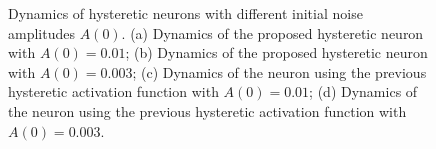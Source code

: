 \documentclass[10pt, a4paper, twocolumn]{article}
\begin{document}
\begin{figure}
\caption{ Dynamics of hysteretic neurons with different initial
noise amplitudes $A(0)$. (a) Dynamics of the proposed hysteretic
neuron with $A(0)=0.01$; (b) Dynamics of the proposed hysteretic
neuron with $A(0)=0.003$; (c) Dynamics of the neuron using the
previous hysteretic activation function with $A(0)=0.01$; (d)
Dynamics of the neuron using the previous hysteretic activation
function with $A(0)=0.003$.} \label{fig4}
\end{figure}
\end{document}
